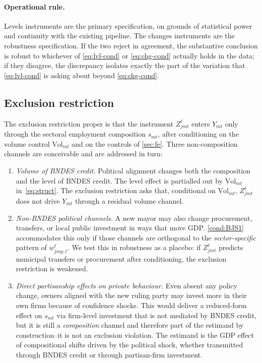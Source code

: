 \documentclass{article}
\newcommand{\Vol}{\mathrm{Vol}}
\theoremstyle{plain}
\theoremstyle{definition}
\theoremstyle{remark}
\begin{document}
\paragraph{Operational rule.}
Levels instruments are the primary specification, on grounds of statistical
power and continuity with the existing pipeline. The changes instruments are
the robustness specification. If the two reject in agreement, the
substantive conclusion is robust to whichever of \eqref{eq:lvl-cond} or
\eqref{eq:chg-cond} actually holds in the data; if they disagree, the
discrepancy isolates exactly the part of the variation that
\eqref{eq:lvl-cond} is asking about beyond \eqref{eq:chg-cond}.

\subsection{Exclusion restriction}

The exclusion restriction proper is that the instrument
$Z^{\ell}_{jmt}$ enters $Y_{mt}$ only through the
sectoral employment composition $s_{mt}$, after conditioning on the volume
control $\Vol_{mt}$ and on the controls of \autoref{sec:fe}. Three
non-composition channels are conceivable and are addressed in turn:
\begin{enumerate}[leftmargin=*,nosep]
\item \emph{Volume of BNDES credit.} Political alignment changes both the
  composition and the level of BNDES credit. The level effect is partialled out
  by $\Vol_{mt}$ in~\eqref{eq:struct}. The exclusion restriction asks that,
  conditional on $\Vol_{mt}$, $Z^{\ell}_{jmt}$ does not drive $Y_{mt}$ through a
  residual volume channel.
\item \emph{Non-BNDES political channels.} A new mayor may also change
  procurement, transfers, or local public investment in ways that move
  GDP. \autoref{cond:BJS1} accommodates this only if those channels are
  orthogonal to the \emph{sector-specific} pattern of $w^{\ell}_{jmp,t}$. We
  test this in robustness as a placebo: if $Z^{\ell}_{jmt}$ predicts municipal
  transfers or procurement after conditioning, the exclusion restriction is
  weakened.
\item \emph{Direct partisanship effects on private behaviour.} Even absent
  any policy change, owners aligned with the new ruling party may invest more
  in their own firms because of confidence shocks. This would deliver a
  reduced-form effect on $s_{mt}$ via firm-level investment that is not
  mediated by BNDES credit, but it is still a \emph{composition} channel and
  therefore part of the estimand by construction--it is not an exclusion
  violation. The estimand is the GDP effect of compositional shifts driven by
  the political shock, whether transmitted through BNDES credit or through
  partisan-firm investment.
\end{enumerate}
\end{document}
